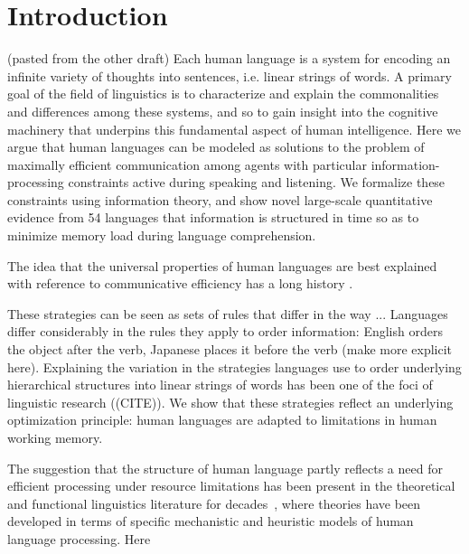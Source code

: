 \documentclass[11pt,letterpaper]{article}
\newcommand\mhahn[1]{{\color{red}(#1)}}
\newcommand\note[1]{{\color{red}(#1)}}
\newcommand\jd[1]{{\color{red}(#1)}}
\begin{document}
 
\section{Introduction}





\mhahn{pasted from the other draft}
Each human language is a system for encoding an infinite variety of thoughts into sentences, i.e. linear strings of words.
A primary goal of the field of linguistics is to characterize and explain the commonalities and differences among these systems, and so to gain insight into the cognitive machinery that underpins this fundamental aspect of human intelligence.
Here we argue that human languages can be modeled as solutions to the problem of maximally efficient communication among agents with particular information-processing constraints active during speaking and listening.
We formalize these constraints using information theory, and show novel large-scale quantitative evidence from 54 languages that information is structured in time so as to minimize memory load during language comprehension.

The idea that the universal properties of human languages are best explained with reference to communicative efficiency has a long history \cite{gabelentz1901sprachwissenschaft,zipf1949human,hockett1960origin,givon1991markedness,hawkins1994performance,hawkins2004efficiency,hawkins2014crosslinguistic,croft2001functional,haspelmath2008parametric,jaeger2011language,gibson2019efficiency}.



These strategies can be seen as sets of rules that differ in the way ...
Languages differ considerably in the rules they apply to order information: English orders the object after the verb, Japanese places it before the verb \note{make more explicit here}.
Explaining the variation in the strategies languages use to  order underlying hierarchical structures into linear strings of words has been one of the foci of linguistic research (\jd{CITE}).
We show that these strategies reflect an underlying optimization principle: human languages are adapted to limitations in human working memory.

The suggestion that the structure of human language partly reflects a need for efficient processing under resource limitations has been present in the theoretical and functional linguistics literature for decades~\cite{berwick1984grammatical,hawkins1994performance}, where theories have been developed in terms of specific mechanistic and heuristic models of human language processing.
Here 
\end{document}
